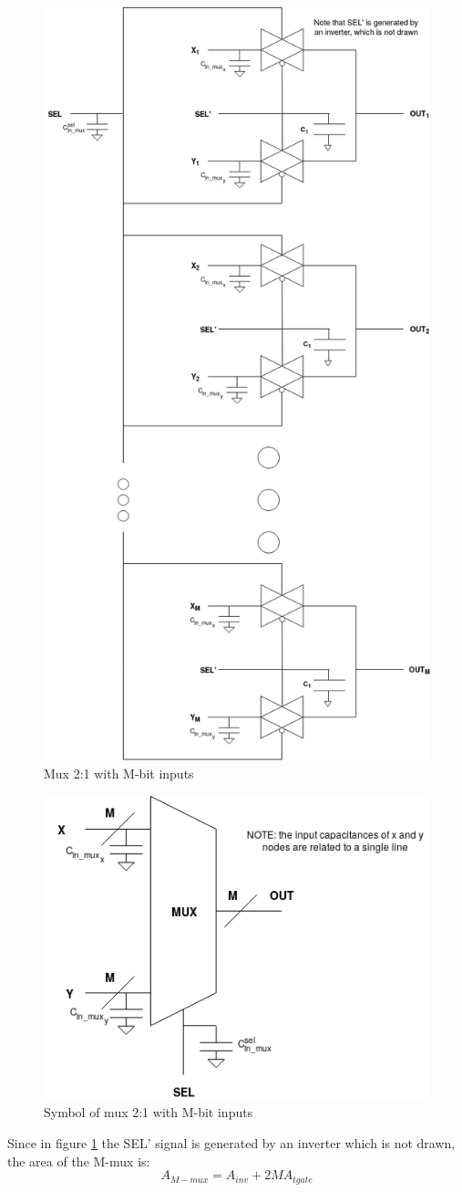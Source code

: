 \begin{figure}[H]
\centering
\includegraphics[width = 8 cm, height = 14 cm]{pentium/four_2to1_mux.png}
\caption{Mux 2:1 with M-bit inputs}
\label{fig:M_sig_length_2to1mux}
\end{figure}

\begin{figure}[H]
\centering
\includegraphics[width = 8 cm, height = 6 cm]{pentium/mux_schematic_m.png}
\caption{Symbol of mux 2:1 with M-bit inputs}
\label{fig:mux_black_box_m} 
\end{figure}

Since in figure \ref{fig:M_sig_length_2to1mux} the SEL' signal is generated by an inverter which is not drawn, the area of the M-mux is:
\begin{equation}
A_{M-mux} = A_{inv} + 2M A_{tgate}
\end{equation}

